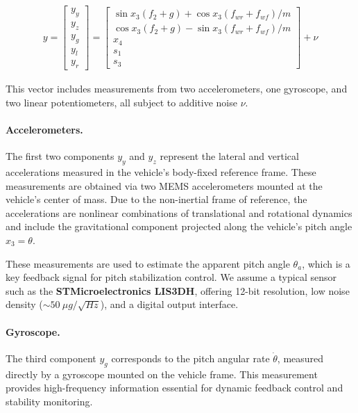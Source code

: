 \documentclass[]{report}
\begin{document}
\begin{align}
	y = \begin{bmatrix}
		y_y \\ y_z \\ y_g \\ y_l \\ y_r
	\end{bmatrix} =
	\begin{bmatrix}
		\sin x_3(f_2 + g) + \cos x_3(f_{wr} + f_{wf})/m \\
		\cos x_3(f_2 + g) - \sin x_3(f_{wr} + f_{wf})/m \\
		x_4 \\
		s_1 \\
		s_3
	\end{bmatrix} + \nu
\end{align}

This vector includes measurements from two accelerometers, one gyroscope, and two linear potentiometers, all subject to additive noise $\nu$.

\paragraph{Accelerometers.}
The first two components $y_y$ and $y_z$ represent the lateral and vertical accelerations measured in the vehicle’s body-fixed reference frame. These measurements are obtained via two MEMS accelerometers mounted at the vehicle's center of mass. Due to the non-inertial frame of reference, the accelerations are nonlinear combinations of translational and rotational dynamics and include the gravitational component projected along the vehicle's pitch angle $x_3 = \theta$.

These measurements are used to estimate the apparent pitch angle $\theta_a$, which is a key feedback signal for pitch stabilization control. We assume a typical sensor such as the \textbf{STMicroelectronics LIS3DH}, offering 12-bit resolution, low noise density ($\sim50~\mu g/\sqrt{Hz}$), and a digital output interface.

\paragraph{Gyroscope.}
The third component $y_g$ corresponds to the pitch angular rate $\dot{\theta}$, measured directly by a gyroscope mounted on the vehicle frame. This measurement provides high-frequency information essential for dynamic feedback control and stability monitoring.
\end{document}
